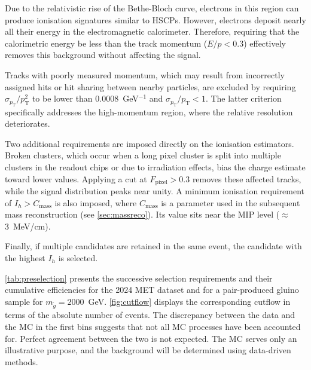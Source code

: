 Due to the relativistic rise of the Bethe-Bloch curve, electrons in this region can produce ionisation signatures similar to HSCPs. However, electrons deposit nearly all their energy in the electromagnetic calorimeter. Therefore, requiring that the calorimetric energy be less than the track momentum ($E/p < 0.3$) effectively removes this background without affecting the signal.

Tracks with poorly measured momentum, which may result from incorrectly assigned hits or hit sharing between nearby particles, are excluded by requiring $\sigma_{p_{\mathrm{T}}}/p_{\mathrm{T}}^{2}$ to be lower than 0.0008~GeV$^{-1}$ and $\sigma_{p_{\mathrm{T}}}/p_{\mathrm{T}} < 1$. The latter criterion specifically addresses the high-momentum region, where the relative resolution deteriorates.

Two additional requirements are imposed directly on the ionisation estimators. Broken clusters, which occur when a long pixel cluster is split into multiple clusters in the readout chips or due to irradiation effects, bias the charge estimate toward lower values. Applying a cut at $F_\textrm{pixel} > 0.3$ removes these affected tracks, while the signal distribution peaks near unity. A minimum ionisation requirement of $I_h > C_\mathrm{mass}$ is also imposed, where $C_\mathrm{mass}$ is a parameter used in the subsequent mass reconstruction (see \cref{sec:massreco}). Its value sits near the MIP level ($\approx$3~MeV/cm).

\vspace{0.5 cm}

Finally, if multiple candidates are retained in the same event, the candidate with the highest $I_h$ is selected.

\vspace{0.5 cm}

\cref{tab:preselection} presents the successive selection requirements and their cumulative efficiencies for the 2024 MET dataset and for a pair-produced gluino sample for $m_{\tilde{g}} = 2000$~GeV. \cref{fig:cutflow} displays the corresponding cutflow in terms of the absolute number of events. The discrepancy between the data and the MC in the first bins suggests that not all MC processes have been accounted for. Perfect agreement between the two is not expected. The MC serves only an illustrative purpose, and the background will be determined using data-driven methods. 

